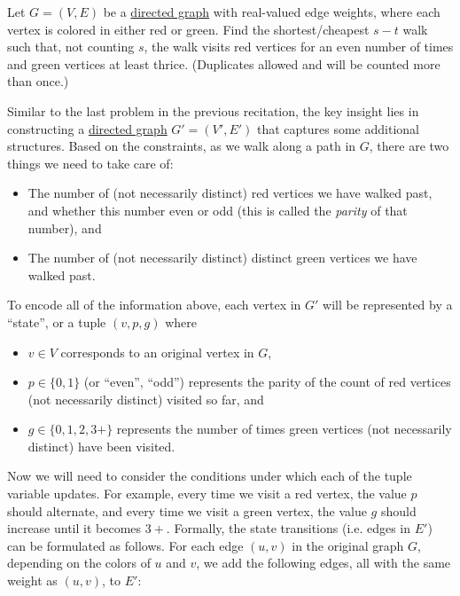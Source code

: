   \begin{exercise}
    Let $G=(V,E)$ be a \hyperref[def:directed-graph]{directed graph} with real-valued edge weights, where each vertex is colored in either {\color{red} red} or {\color{dkgreen} green}. Find the shortest/cheapest $s-t$ walk such that, not counting $s$, the walk visits red vertices for an even number of times and green vertices at least thrice. (Duplicates allowed and will be counted more than once.)
  \end{exercise}
  \begin{solution}
    Similar to the last problem in the previous recitation, the key insight lies in constructing a \hyperref[def:directed-graph]{directed graph} $G'=(V', E')$ that captures some additional structures. Based on the constraints, as we walk along a path in $G$, there are two things we need to take care of: 
    \begin{itemize}
      \item The number of (not necessarily distinct) red vertices we have walked past, and whether this number even or odd (this is called the \textit{parity} of that number), and
      \item The number of (not necessarily distinct) distinct green vertices we have walked past. 
    \end{itemize}
    To encode all of the information above, each vertex in $G'$ will be represented by a ``state'', or a tuple $(v, p, g)$ where
    \begin{itemize}
      \item $v\in V$ corresponds to an original vertex in $G$,
      \item $p\in \{0,1\}$ (or ``even'', ``odd'') represents the parity of the count of red vertices (not necessarily distinct) visited so far, and
      \item $g \in \{0,1,2,3+\}$ represents the number of times green vertices (not necessarily distinct) have been visited.
    \end{itemize}

    Now we will need to consider the conditions under which each of the tuple variable updates. For example, every time we visit a red vertex, the value $p$ should alternate, and every time we visit a green vertex, the value $g$ should increase until it becomes $3+$. Formally, the state transitions (i.e. edges in $E'$) can be formulated as follows. For each edge $(u,v)$ in the original graph $G$, depending on the colors of $u$ and $v$, we add the following edges, all with the same weight as $(u,v)$, to $E'$:


\end{solution}
